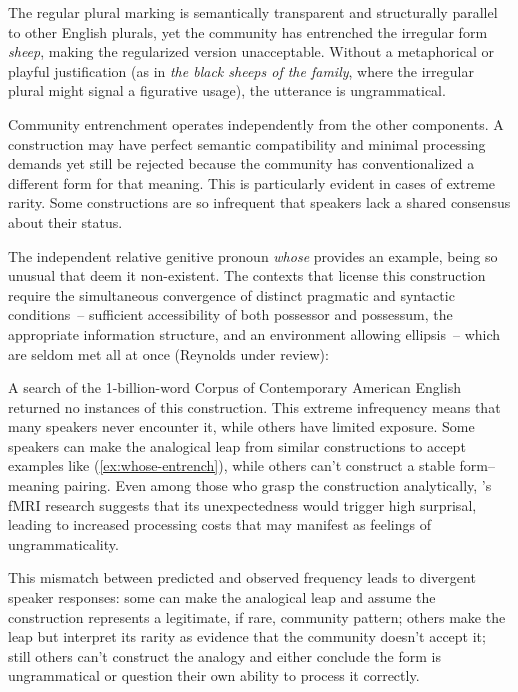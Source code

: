 \documentclass[12pt,letterpaper]{article}
\begin{document}
\label{ex:sheeps-entrench}
\z

The regular plural marking is semantically transparent and structurally parallel to other English plurals, yet the community has entrenched the irregular form \textit{sheep}, making the regularized version unacceptable. Without a metaphorical or playful justification (as in \textit{the black sheeps of the family}, where the irregular plural might signal a figurative usage), the utterance is ungrammatical.

Community entrenchment operates independently from the other components. A construction may have perfect semantic compatibility and minimal processing demands yet still be rejected because the community has conventionalized a different form for that meaning. This is particularly evident in cases of extreme rarity. Some constructions are so infrequent that speakers lack a shared consensus about their status. 

The independent relative genitive pronoun \textit{whose} provides an example, being so unusual that \textcite{hankamer1973whose} deem it non-existent. The contexts that license this construction require the simultaneous convergence of distinct pragmatic and syntactic conditions~-- sufficient accessibility of both possessor and possessum, the appropriate information structure, and an environment allowing ellipsis~-- which are seldom met all at once (Reynolds under review):

\z

A search of the 1-billion-word Corpus of Contemporary American English returned no instances of this construction. This extreme infrequency means that many speakers never encounter it, while others have limited exposure. Some speakers can make the analogical leap from similar constructions to accept examples like (\ref{ex:whose-entrench}), while others can't construct a stable form--meaning pairing. Even among those who grasp the construction analytically, \textcite{shain2020fmri}'s fMRI research suggests that its unexpectedness would trigger high surprisal, leading to increased processing costs that may manifest as feelings of ungrammaticality.

This mismatch between predicted and observed frequency leads to divergent speaker responses: some can make the analogical leap and assume the construction represents a legitimate, if rare, community pattern; others make the leap but interpret its rarity as evidence that the community doesn't accept it; still others can't construct the analogy and either conclude the form is ungrammatical or question their own ability to process it correctly.
\end{document}
